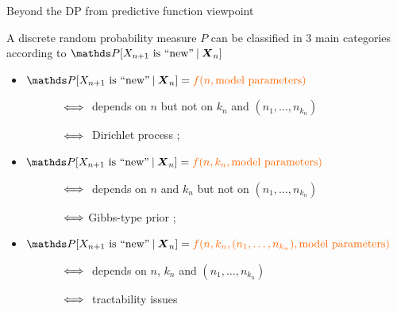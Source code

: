 \begin{frame}{Beyond the DP from predictive function viewpoint} 

A discrete random probability measure $P$ can be classified in 3 main categories according to $\P[X_{n+1}\hbox{ is ``new''} \: |\: \boldsymbol{X}_{n}]$
    \begin{itemize}
    \smallskip
    \item<2->[1)] $\P[X_{n+1}\hbox{ is ``new''} \: |\: \boldsymbol{X}_{n}]=\alert{f(n, \hbox{model parameters})}$

     $ \hspace{1.2cm} \Longleftrightarrow \ $ depends on $n$ but not on $k_{n}$ and $(n_{1},\ldots,n_{k_{n}})$

     $ \hspace{1.2cm} \Longleftrightarrow \ $ Dirichlet process \citep{ferguson1973bayesian};\\[4pt]
     
    \smallskip

    \item<3->[2)] $\P[X_{n+1}\hbox{ is ``new''} \: |\: \boldsymbol{X}_{n}]=\textcolor{red2}{f(n, k_{n}, \hbox{model parameters})}$

    $ \hspace{1.2cm} \Longleftrightarrow \ $ depends on $n$ and $k_{n}$  but not on $(n_{1},\ldots,n_{k_{n}})$

    $ \hspace{1.2cm} \Longleftrightarrow \ $\textcolor{red2}{Gibbs-type prior} \citep{pitman2003poisson};\\[4pt]

\smallskip

    \item<4->[3)] $\P[X_{n+1}\hbox{ is ``new''} \: |\: \boldsymbol{X}_{n}]=\alert{f(n, k_{n}, (n_{1},\ldots,n_{k_{n}}), \hbox{model parameters})}$

    $ \hspace{1.2cm} \Longleftrightarrow \ $ depends on  $n$, $k_{n}$ and $(n_{1},\ldots,n_{k_{n}})$
    
    $ \hspace{1.2cm} \Longleftrightarrow \ $ tractability issues
    
 \end{itemize}
\end{frame}


